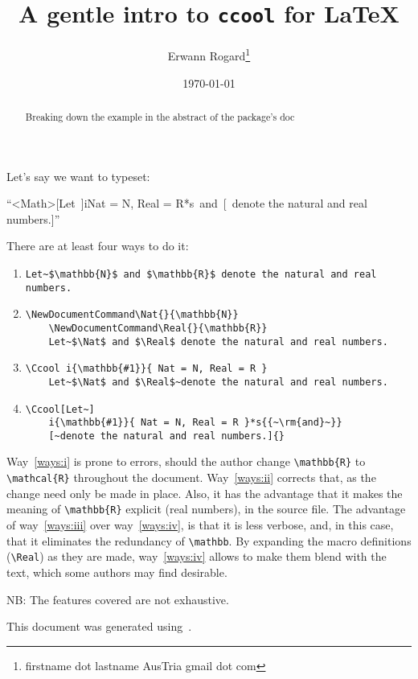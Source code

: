 \documentclass{article}
\title{A gentle intro to \texttt{ccool} for \LaTeX}
\author{Erwann Rogard\thanks{firstname dot lastname AusTria gmail dot com}}
\date{\today}
\providecommand\docways[1]{way~\ref{ways:#1}}
\providecommand\docWays[1]{Way~\ref{ways:#1}}
\begin{document}
\maketitle

\begin{abstract}
  Breaking down the example in the abstract of the package's doc\cite{ccool}
\end{abstract}


Let's say we want to typeset:
\begin{center}
  ``\Ccool<Math>[Let~]i{}{Nat = N, Real = R}*s{{~\rm{and}~}}[~denote the natural and real numbers.]{}''
\end{center}

There are at least four ways to do it:
\begin{enumerate}[label=\emph{\roman*)}]
\item \label{ways:i}
  \begin{Verbatim}[breaklines=true]
    Let~$\mathbb{N}$ and $\mathbb{R}$ denote the natural and real numbers.
  \end{Verbatim}
\item   \label{ways:ii}
  \begin{Verbatim}[breaklines=true]
    \NewDocumentCommand\Nat{}{\mathbb{N}}
    \NewDocumentCommand\Real{}{\mathbb{R}}
    Let~$\Nat$ and $\Real$ denote the natural and real numbers.
  \end{Verbatim}

\item  \label{ways:iii}
  \begin{Verbatim}[breaklines=true]
    \Ccool i{\mathbb{#1}}{ Nat = N, Real = R }
    Let~$\Nat$ and $\Real$~denote the natural and real numbers.
  \end{Verbatim}

\item  \label{ways:iv}
  \begin{Verbatim}[breaklines=true]
    \Ccool[Let~]
    i{\mathbb{#1}}{ Nat = N, Real = R }*s{{~\rm{and}~}}
    [~denote the natural and real numbers.]{}
  \end{Verbatim}
\end{enumerate}

\docWays{i} is prone to errors, should the author change \verb+\mathbb{R}+ to \verb+\mathcal{R}+ throughout the document.
\docWays{ii} corrects that, as the change need only be made in place.
Also, it has the advantage that it makes the meaning of \verb+\mathbb{R}+ explicit (real numbers), in the source file.
The advantage of \docways{iii} over  \docways{iv}, is that it is less verbose,
and, in this case, that it eliminates the redundancy of \verb|\mathbb|.
By expanding the macro definitions (\verb+\Real+) as they are made, \docways{iv} allows to
make them blend with the text, which some authors may find desirable.

NB: The features covered are not exhaustive.

This document was generated using~\CcoolVers.

{}
\printbibliography[heading=subbibliography]
\end{document}
